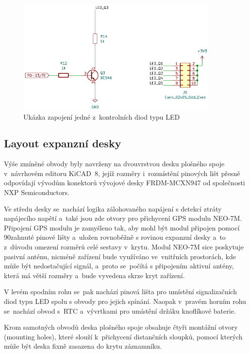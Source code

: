 \begin{figure}[h]
    \centering
    \includegraphics[width=0.90\textwidth]{obrazky-figures/led-diodes.pdf}
    
    \caption{Ukázka zapojení jedné z~kontrolních diod typu LED}
    \label{fig:control-diodes}
\end{figure}

\newpage

\subsection{Layout expanzní desky}
\label{bom_list}
Výše zmíněné obvody byly navrženy na dvouvrstvou desku plošného spoje v~návrhovém editoru KiCAD~8, jejíž rozměry i~rozmístění pinových lišt přesně odpovídají vývodům konektorů vývojové desky FRDM-MCXN947 od společnosti NXP Semiconductors.~\cite{KiCAD}

Ve středu desky se~nachází logika zálohovaného napájení s detekcí ztráty napájecího napětí a~také jsou zde otvory pro přichycení GPS modulu NEO-7M. Připojení GPS modulu je zamyšleno tak, aby mohl být modul připojen pomocí 90\textdegree zahnuté pinové lišty a~uložen rovnoběžně s rovinou expanzní desky a~to z~důvodu omezení rozměrů celé sestavy v~krytu. Modul NEO-7M sice poskytuje pasivní anténu, nicméně zařízení bude využíváno ve~vnitřních prostorách, kde může být nedostačující signál, a~proto se~počítá s připojením aktivní antény, která má větší rozměry a~bude vyvedena skrze kryt zařízení. 

V levém spodním rohu se~pak nachází pinová lišta pro umístění signalizačních diod typu LED spolu s obvody pro jejich spínání. Naopak v~pravém horním rohu se~nachází obvod s~RTC a~vývrtkami pro umístění držáku knoflíkové baterie.

Krom samotných obvodů deska plošného spoje obsahuje čtyři montážní otvory (mounting holes), které slouží k~přichycení distančních sloupků, pomocí kterých může být deska fixně zasazena do krytu záznamníku.

